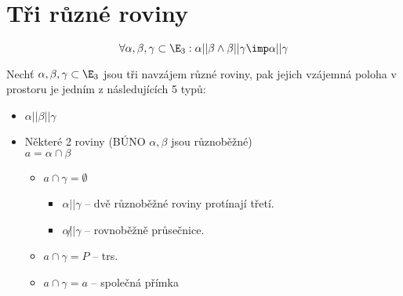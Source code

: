 
\let\braceru=\relax \let\bracelu=\relax 
\def\o#1{\setbox0=
	\hbox{$\kern2pt\overbrace{\kern-2pt#1\kern-2pt}\kern2pt$}\ht0=2.1ex\box0}
\def\to#1{\hbox{#1\rlap{\t{}}}}
\def\rad{\rm{rad}}
\def\f{\frac}
\section{Tři různé roviny}
$$\forall \alpha,\beta,\gamma\subset\E_3:  \alpha || \beta \land \beta || \gamma \imp \alpha || \gamma$$

Nechť $\alpha,\beta,\gamma\subset \E_3$ jsou tři navzájem různé roviny, pak jejich  vzájemná poloha v prostoru je jedním z následujících 5 typů:
\begin{itemize}
	\item $\alpha||\beta||\gamma$ 
	\item Některé 2 roviny (BÚNO $\alpha,\beta$ jsou různoběžné)\\
		$a=\alpha\cap\beta$
		\begin{itemize}
			\item $a\cap \gamma = \emptyset$
				\begin{itemize}
					\item $\alpha || \gamma$ -- dvě různoběžné roviny protínají třetí.
					\item $\alpha \not || \gamma$ -- rovnoběžně průsečnice.
				\end{itemize}
			\item $a\cap\gamma = {P}$ -- trs.
			\item $a\cap \gamma = a$ -- společná přímka
		\end{itemize}
\end{itemize}


